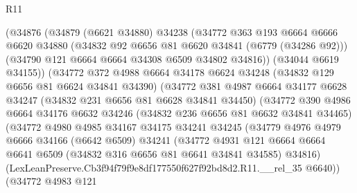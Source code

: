 \begin{lexlean}{R11}
\begin{coremodule}
                    (@34876
                      (@34879
                        (@6621 @34880)
                        @34238
                        (@34772
                          @363
                          @193
                          @6664
                          @6666
                          @6620
                          @34880
                          (@34832 @92 @6656 @81 @6620 @34841 (@6779 (@34286 @92)))
                          (@34790 @121 @6664 @6664 @34308 @6509 @34802 @34816))
                        (@34044 @6619 @34155))
                      (@34772
                        @372
                        @4988
                        @6664
                        @34178
                        @6624
                        @34248
                        (@34832 @129 @6656 @81 @6624 @34841 @34390)
                        (@34772
                          @381
                          @4987
                          @6664
                          @34177
                          @6628
                          @34247
                          (@34832 @231 @6656 @81 @6628 @34841 @34450)
                          (@34772
                            @390
                            @4986
                            @6664
                            @34176
                            @6632
                            @34246
                            (@34832 @236 @6656 @81 @6632 @34841 @34465)
                            (@34772
                              @4980
                              @4985
                              @34167
                              @34175
                              @34241
                              @34245
                              (@34779
                                @4976
                                @4979
                                @6666
                                @34166
                                (@6642 @6509)
                                @34241
                                (@34772
                                  @4931
                                  @121
                                  @6664
                                  @6664
                                  @6641
                                  @6509
                                  (@34832 @316 @6656 @81 @6641 @34841 @34585)
                                  @34816)
                                (LexLeanPreserve.Cb3f94f79f9e8df177550f627f92bd8d2.R11.__rel_35
                                  @6640))
                              (@34772
                                @4983
                                @121

\end{coremodule}
\end{lexlean}

